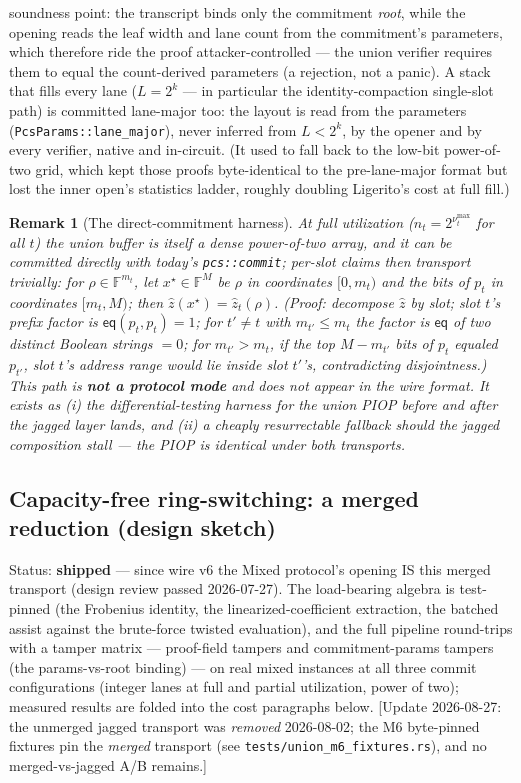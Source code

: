 \documentclass[11pt]{article}
\newcommand{\F}{\mathbb{F}}                       %
\newcommand{\eq}{\mathsf{eq}}
\newcommand{\code}[1]{\texttt{#1}}
\newtheorem{remark}{Remark}
\theoremstyle{definition}
\begin{document}
soundness point: the transcript binds only the commitment \emph{root},
while the opening reads the leaf width and lane count from the
commitment's parameters, which therefore ride the proof
attacker-controlled --- the union verifier requires them to equal the
count-derived parameters (a rejection, not a panic). A stack that
fills every lane ($L = 2^{k}$ --- in particular the
identity-compaction single-slot path) is committed lane-major too: the
layout is read from the parameters (\code{PcsParams::lane\_major}),
never inferred from $L < 2^k$, by the opener and by every verifier,
native and in-circuit. (It used to fall back to the low-bit
power-of-two grid, which kept those proofs byte-identical to the
pre-lane-major format but lost the inner open's statistics ladder,
roughly doubling Ligerito's cost at full fill.)

\begin{remark}[The direct-commitment harness]\label{rem:harness}
At full utilization ($n_t = 2^{\nu_t^{\max}}$ for all $t$) the union buffer
is itself a dense power-of-two array, and it can be committed directly with
today's \code{pcs::commit}; per-slot claims then transport \emph{trivially}:
for $\rho \in \F^{m_t}$, let $x^\star \in \F^{M}$ be $\rho$ in coordinates
$[0, m_t)$ and the bits of $p_t$ in coordinates $[m_t, M)$; then
$\hat z(x^\star) = \hat z_t(\rho)$. (Proof: decompose $\hat z$ by slot; slot
$t$'s prefix factor is $\eq(p_t, p_t) = 1$; for $t' \ne t$ with
$m_{t'} \le m_t$ the factor is $\eq$ of two distinct Boolean strings $= 0$;
for $m_{t'} > m_t$, if the top $M - m_{t'}$ bits of $p_t$ equaled $p_{t'}$,
slot $t$'s address range would lie inside slot $t'$'s, contradicting
disjointness.) This path is \textbf{not a protocol mode} and does not
appear in the wire format. It exists as (i) the differential-testing
harness for the union PIOP before and after the jagged layer lands, and
(ii) a cheaply resurrectable fallback should the jagged composition stall
--- the PIOP is identical under both transports.
\end{remark}

\subsection{Capacity-free ring-switching: a merged reduction (design
sketch)}\label{sec:merged}

Status: \textbf{shipped} --- since wire v6 the Mixed protocol's opening
IS this merged transport (design review passed 2026-07-27). The
load-bearing algebra is test-pinned (the Frobenius identity, the
linearized-coefficient extraction, the batched assist against the
brute-force twisted evaluation), and the full pipeline round-trips with
a tamper matrix --- proof-field tampers and commitment-params tampers
(the params-vs-root binding) --- on real mixed instances at all three
commit configurations (integer lanes at full and partial utilization,
power of two); measured results are folded into the cost paragraphs
below. [Update 2026-08-27: the unmerged jagged transport was \emph{removed}
2026-08-02; the M6 byte-pinned fixtures pin the \emph{merged} transport
(see \code{tests/union\_m6\_fixtures.rs}), and no merged-vs-jagged A/B
remains.]
\end{document}

